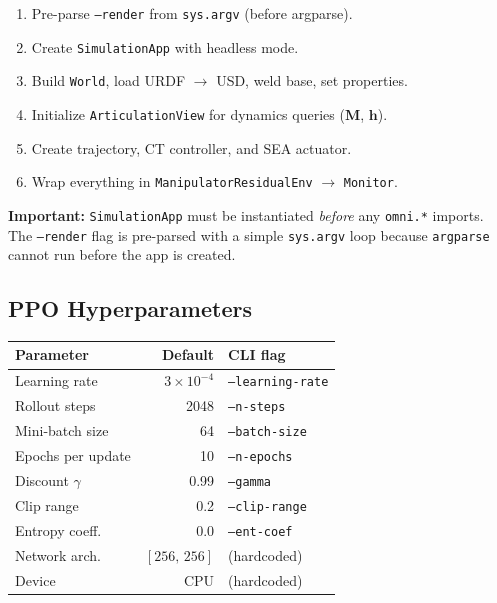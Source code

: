 \documentclass[11pt, a4paper]{article}
\newcommand{\bM}{\bm{M}}
\begin{document}
\begin{enumerate}[nosep]
  \item Pre-parse \texttt{--render} from \texttt{sys.argv} (before argparse).
  \item Create \texttt{SimulationApp} with headless mode.
  \item Build \texttt{World}, load URDF $\to$ USD, weld base, set properties.
  \item Initialize \texttt{ArticulationView} for dynamics queries ($\bM$, $\bm{h}$).
  \item Create trajectory, CT controller, and SEA actuator.
  \item Wrap everything in \texttt{ManipulatorResidualEnv} $\to$ \texttt{Monitor}.
\end{enumerate}

\begin{mdframed}
\textbf{Important:} \texttt{SimulationApp} must be instantiated \emph{before}
any \texttt{omni.*} imports.  The \texttt{--render} flag is pre-parsed with
a simple \texttt{sys.argv} loop because \texttt{argparse} cannot run before
the app is created.
\end{mdframed}

\subsection{PPO Hyperparameters}

\begin{center}
\renewcommand{\arraystretch}{1.15}
\begin{tabular}{lrl}
\toprule
\textbf{Parameter} & \textbf{Default} & \textbf{CLI flag} \\
\midrule
Learning rate       & $3 \times 10^{-4}$ & \texttt{--learning-rate} \\
Rollout steps       & 2048               & \texttt{--n-steps} \\
Mini-batch size     & 64                 & \texttt{--batch-size} \\
Epochs per update   & 10                 & \texttt{--n-epochs} \\
Discount $\gamma$   & 0.99               & \texttt{--gamma} \\
Clip range          & 0.2                & \texttt{--clip-range} \\
Entropy coeff.      & 0.0                & \texttt{--ent-coef} \\
Network arch.       & $[256,\,256]$      & (hardcoded) \\
Device              & CPU                & (hardcoded) \\
\bottomrule
\end{tabular}
\end{center}
\end{document}
